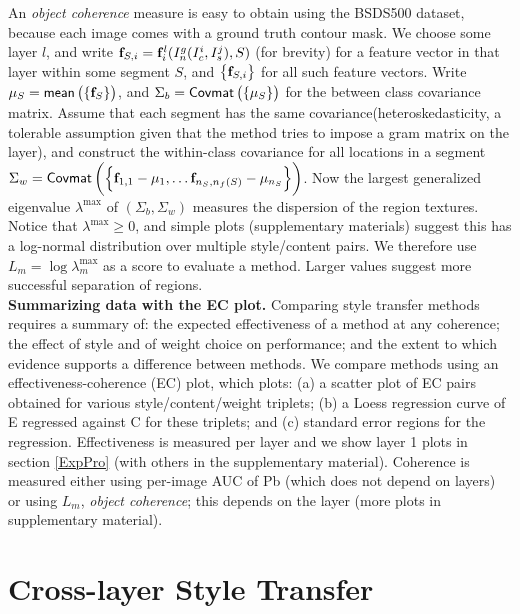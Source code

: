 \documentclass[runningheads]{llncs}
\newcommand{\vect}[1]{{\bf {#1}}}
\begin{document}
%

An \textit{object coherence} measure is easy to obtain using the BSDS500 dataset, because each image comes with a ground truth contour
mask.  We choose some layer $l$, and write $\vect{f}_{S,i}=\vect{f}_{i}^{l}(I^g_n(I_c^i,I_s^j), S)$ (for brevity) for a feature
vector in that layer within some segment $S$, and $\left\{\vect{f}_{S,i}\right\}$ for all such feature
vectors.  Write $\mu_S=\mean{\vect{f}_S}$, and $\Sigma_b={ {\small {\mathsf{Covmat}} \left( \left\{ {{\mu_S}} \right\} \right) }}$ for the between class covariance matrix.
Assume that each segment has the same covariance(heteroskedasticity,
a tolerable assumption given that the method tries to impose a gram matrix on the layer), and construct the within-class covariance for all locations in a segment 
$\Sigma_w=\covmat{\vect{f}_{1,1}-\mu_1, \ldots \vect{f}_{n_S,n_f(S)}-\mu_{n_S}}$.
Now the
largest generalized eigenvalue $\lambda^{\mbox{max}}$ of $(\Sigma_b, \Sigma_w)$ measures the dispersion of the region
textures.   Notice that $\lambda^{\mbox{max}}\geq 0$, and simple plots (supplementary materials) suggest this has a
log-normal distribution over multiple style/content pairs.  We therefore use $L_m=\log \lambda^{\mbox{max}}_{m}$ as a
score to evaluate a method.  Larger values suggest more successful separation of regions.\\

{\bf Summarizing data with the EC plot.} Comparing style transfer methods requires a 
summary of: the expected effectiveness of a method at any coherence; the effect of style
 and of weight choice on performance; and the extent to which evidence supports a difference between methods.
 We compare methods using an effectiveness-coherence (EC) plot, which plots: 
 (a) a scatter plot of EC pairs obtained for various style/content/weight triplets;   
 (b) a Loess regression curve of E regressed against C for these triplets; and 
 (c) standard error regions for the regression.     
 Effectiveness is measured per layer and we show layer 1 plots in section \ref{ExpPro} (with others in the supplementary material). Coherence is measured either using per-image AUC of Pb (which does not depend on layers) or using $L_m$, \textit{object coherence}; this depends on the layer (more plots in supplementary material).
\section{Cross-layer Style Transfer}\label{sec:Cross}
\end{document}
